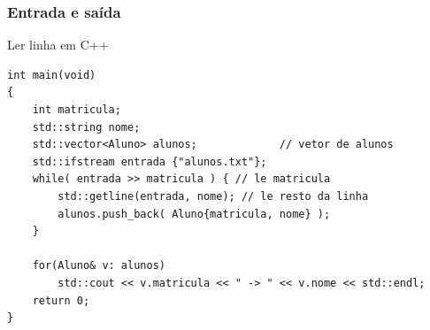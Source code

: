 \documentclass[xcolor={usenames,dvipsnames},10pt,presentation,aspectratio=169]{beamer}
\begin{document}
\begin{frame}[fragile]
  \frametitle{Entrada e saída}
  \begin{block}{Ler linha em C++}
\begin{lstlisting}
int main(void)
{
    int matricula;
    std::string nome;
    std::vector<Aluno> alunos;             // vetor de alunos
    std::ifstream entrada {"alunos.txt"};
    while( entrada >> matricula ) { // le matricula 
        std::getline(entrada, nome); // le resto da linha
        alunos.push_back( Aluno{matricula, nome} );
    }

    for(Aluno& v: alunos)
        std::cout << v.matricula << " -> " << v.nome << std::endl;
    return 0;
}
\end{lstlisting}
  \end{block}
\end{frame}
\end{document}
